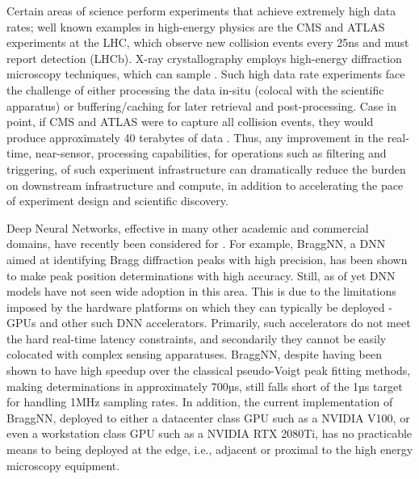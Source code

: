 Certain areas of science perform experiments that achieve extremely high data rates; well known examples in high-energy physics are the CMS and ATLAS experiments at the LHC, which observe new collision events every 25ns and must report detection  (LHCb).
X-ray crystallography employs high-energy diffraction microscopy techniques, which can sample .
Such high data rate experiments face the challenge of either processing the data in-situ (colocal with the scientific apparatus) or buffering/caching for later retrieval and post-processing.
Case in point, if CMS and ATLAS were to capture all collision events, they would produce approximately 40 terabytes of data .
Thus, any improvement in the real-time, near-sensor, processing capabilities, for operations such as filtering and triggering, of such experiment infrastructure can dramatically reduce the burden on downstream infrastructure and compute, in addition to accelerating the pace of experiment design and scientific discovery.

Deep Neural Networks, effective in many other academic and commercial domains, have recently been considered for .
For example, BraggNN, a DNN aimed at identifying Bragg diffraction peaks with high precision, has been shown to make peak position determinations with high accuracy.
Still, as of yet DNN models have not seen wide adoption in this area.
This is due to the limitations imposed by the hardware platforms on which they can typically be deployed - GPUs and other such DNN accelerators.
Primarily, such accelerators do not meet the hard real-time latency constraints, and secondarily they cannot be easily colocated with complex sensing apparatuses.
BraggNN, despite having been shown to have high speedup over the classical pseudo-Voigt peak fitting methods, making determinations in approximately 700µs, still falls short of the 1µs target for handling 1MHz sampling rates.
In addition, the current implementation of BraggNN, deployed to either a datacenter class GPU such as a NVIDIA V100, or even a workstation class GPU such as a NVIDIA RTX 2080Ti, has no practicable means to being deployed at the edge, i.e., adjacent or proximal to the high energy microscopy equipment.

